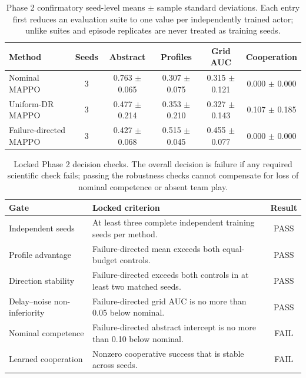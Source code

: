 \newcommand{\PhaseTwoStatus}{Phase 2 confirmatory gate: FAILED}
\begin{table}[t]
\centering
\scriptsize
\setlength{\tabcolsep}{4pt}
\begin{tabular}{lccccc}
\toprule
Method & Seeds & Abstract & Profiles & Grid AUC & Cooperation \\
\midrule
Nominal MAPPO & 3 & 0.763 $\pm$ 0.065 & 0.307 $\pm$ 0.075 & 0.315 $\pm$ 0.121 & 0.000 $\pm$ 0.000 \\
Uniform-DR MAPPO & 3 & 0.477 $\pm$ 0.214 & 0.353 $\pm$ 0.210 & 0.327 $\pm$ 0.143 & 0.107 $\pm$ 0.185 \\
Failure-directed MAPPO & 3 & 0.427 $\pm$ 0.068 & 0.515 $\pm$ 0.045 & 0.455 $\pm$ 0.077 & 0.000 $\pm$ 0.000 \\
\bottomrule
\end{tabular}
\caption{Phase 2 confirmatory seed-level means $\pm$ sample standard deviations. Each entry first reduces an evaluation suite to one value per independently trained actor; unlike suites and episode replicates are never treated as training seeds.}
\label{tab:phase2-confirmatory}
\end{table}

\begin{table}[t]
\centering
\small
\begin{tabular}{p{}p{}c}
\toprule Gate & Locked criterion & Result \\
\midrule
Independent seeds & At least three complete independent training seeds per method. & PASS \\
Profile advantage & Failure-directed mean exceeds both equal-budget controls. & PASS \\
Direction stability & Failure-directed exceeds both controls in at least two matched seeds. & PASS \\
Delay--noise non-inferiority & Failure-directed grid AUC is no more than 0.05 below nominal. & PASS \\
Nominal competence & Failure-directed abstract intercept is no more than 0.10 below nominal. & FAIL \\
Learned cooperation & Nonzero cooperative success that is stable across seeds. & FAIL \\
\bottomrule
\end{tabular}
\caption{Locked Phase 2 decision checks. The overall decision is failure if any required scientific check fails; passing the robustness checks cannot compensate for loss of nominal competence or absent team play.}
\label{tab:phase2-gates}
\end{table}
